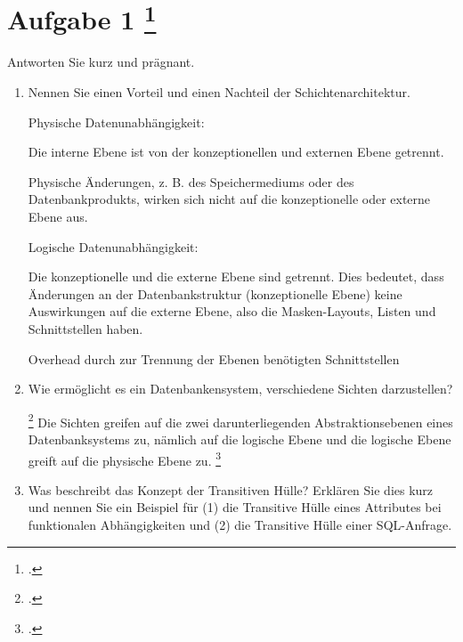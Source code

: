 \documentclass{lehramt-informatik-aufgabe}
\begin{document}
\section{Aufgabe 1
\footcite{examen:66116:2019:09}}

Antworten Sie kurz und prägnant.

\begin{enumerate}


\item Nennen Sie einen Vorteil und einen Nachteil der
Schichtenarchitektur.

\begin{liAntwort}

Physische Datenunabhängigkeit:

Die interne Ebene ist von der konzeptionellen und externen Ebene getrennt.

Physische Änderungen, z. B. des Speichermediums oder des
Datenbankprodukts, wirken sich nicht auf die konzeptionelle oder externe
Ebene aus.

Logische Datenunabhängigkeit:

Die konzeptionelle und die externe Ebene sind getrennt. Dies bedeutet,
dass Änderungen an der Datenbankstruktur (konzeptionelle Ebene) keine
Auswirkungen auf die externe Ebene, also die Masken-Layouts, Listen und
Schnittstellen haben.



Overhead durch zur Trennung der Ebenen benötigten Schnittstellen
\end{liAntwort}


\item Wie ermöglicht es ein Datenbankensystem, verschiedene Sichten
darzustellen?

\begin{liAntwort}
\footcite[Seite 444]{schneider}
Die Sichten greifen auf die zwei darunterliegenden Abstraktionsebenen
eines Datenbanksystems zu, nämlich auf die logische Ebene und die
logische Ebene greift auf die physische Ebene zu.
\footcite[Seite 23]{kemper}
\end{liAntwort}


\item Was beschreibt das Konzept der Transitiven Hülle? Erklären Sie
dies kurz und nennen Sie ein Beispiel für (1) die Transitive Hülle eines
Attributes bei funktionalen Abhängigkeiten und (2) die Transitive Hülle
einer SQL-Anfrage.


\end{enumerate}
\end{document}
